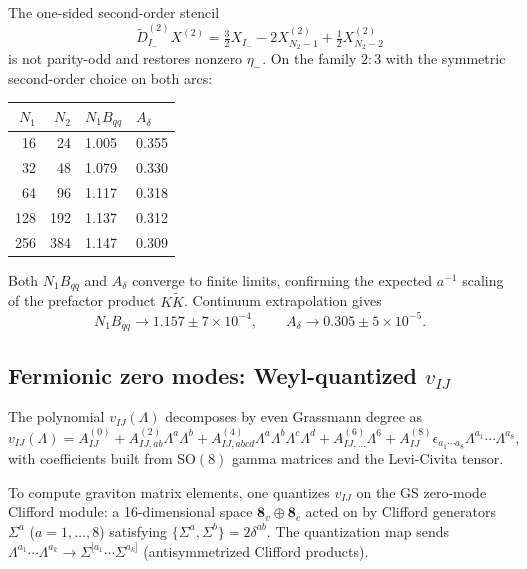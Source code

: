\documentclass[11pt]{article}
\begin{document}
\smallskip
The one-sided second-order stencil
\begin{equation}
\widetilde D^{(2)}_{I_-}X^{(2)} = \tfrac{3}{2}X_{I_-} - 2X_{N_2-1}^{(2)} + \tfrac{1}{2}X_{N_2-2}^{(2)}
\label{eq:stencil-2nd}
\end{equation}
is not parity-odd and restores nonzero $\eta_-$. On the family $2:3$ with the symmetric second-order choice on both arcs:

\medskip
\begin{center}
\begin{tabular}{r r l l}
\toprule
$N_1$ & $N_2$ & $N_1 B_{qq}$ & $A_\delta$ \\
\midrule
16 & 24 & 1.005 & 0.355 \\
32 & 48 & 1.079 & 0.330 \\
64 & 96 & 1.117 & 0.318 \\
128 & 192 & 1.137 & 0.312 \\
256 & 384 & 1.147 & 0.309 \\
\bottomrule
\end{tabular}
\end{center}
\medskip

Both $N_1 B_{qq}$ and $A_\delta$ converge to finite limits, confirming the expected $a^{-1}$ scaling of the prefactor product $K\widetilde K$. Continuum extrapolation gives
\begin{equation}
N_1 B_{qq} \to 1.157 \pm 7 \times 10^{-4},
\qquad
A_\delta \to 0.305 \pm 5 \times 10^{-5}.
\label{eq:prefactor-fit}
\end{equation}

\subsection{Fermionic zero modes: Weyl-quantized \texorpdfstring{$v_{IJ}$}{vIJ}}

The polynomial $v_{IJ}(\Lambda)$ decomposes by even Grassmann degree as
\begin{equation}
v_{IJ}(\Lambda) = A_{IJ}^{(0)} + A_{IJ,ab}^{(2)}\Lambda^a\Lambda^b + A_{IJ,abcd}^{(4)}\Lambda^a\Lambda^b\Lambda^c\Lambda^d + A_{IJ,\dots}^{(6)}\Lambda^6 + A_{IJ}^{(8)}\epsilon_{a_1\cdots a_8}\Lambda^{a_1}\cdots\Lambda^{a_8},
\label{eq:vij-decomp}
\end{equation}
with coefficients built from SO$(8)$ gamma matrices and the Levi-Civita tensor.

To compute graviton matrix elements, one quantizes $v_{IJ}$ on the GS zero-mode Clifford module: a 16-dimensional space $\mathbf{8}_v \oplus \mathbf{8}_c$ acted on by Clifford generators $\Sigma^a$ ($a = 1, \dots, 8$) satisfying $\{\Sigma^a, \Sigma^b\} = 2\delta^{ab}$. The quantization map sends $\Lambda^{a_1}\cdots\Lambda^{a_k} \to \Sigma^{[a_1}\cdots\Sigma^{a_k]}$ (antisymmetrized Clifford products).
\end{document}

